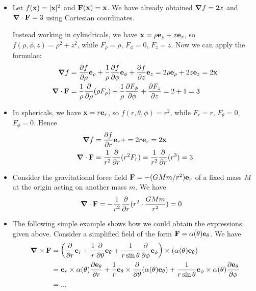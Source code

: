 \documentclass{../template/note}
\begin{document}
    \begin{example*}
        \begin{itemize}
            \item Let \(f(\V x) = |\V x|^2\) and \(\V F(\V x) = \V x\). We have already obtained \(\grad f = 2x\) and \(\div \V F = 3\) using Cartesian coordinates.
            
            Instead working in cylindricals, we have \(\V x = \rho \V e_\rho + z \V e_z\), so \(f(\rho, \phi, z) = \rho^2 + z^2\), while \(F_\rho = \rho\), \(F_\phi = 0\), \(F_z = z\). Now we can apply the formulae:
            \begin{align*}
                \grad f &= \pd f \rho \V e_\rho + \frac 1 \rho \pd f \phi \V e_\phi + \pd f z \V e_z = 2\rho \V e_\rho + 2z \V e_z = 2\V x \\
                \div \V F &= \frac 1 \rho \pd{}\rho(\rho F_\rho) + \frac 1 \rho \pd{F_\phi}{\phi} + \pd{F_z}{z} = 2 + 1 = 3
            \end{align*}
            \item In sphericals, we have \(\V x = r \V e_r\), so \(f(r, \theta, \phi) = r^2\), while \(F_r = r\), \(F_\theta = 0\), \(F_\phi = 0\). Hence
            \begin{align*}
                \grad f &= \pd{f}{r} \V e_r + = 2r \V e_r = 2 \V x \\
                \div \V F &= \frac 1 {r^2} \pd{} r (r^2F_r) = \frac 1 {r^2} \pd{} r (r^3) = 3
            \end{align*}
            \item Consider the gravitational force field \(\V F = -(GMm/r^2)\V e_r\) of a fixed mass \(M\) at the origin acting on another mass \(m\). We have
            \begin{align*}
                \div \V F = -\frac 1 {r^2} \pd{} r (r^2 \cdot \frac{GMm}{r^2}) &= 0 
            \end{align*}
            \item The following simple example shows how we could obtain the expressions given above. Consider a simplified field of the form \(\V F = \alpha(\theta) \V e_\theta\). We have
            \begin{align*}
                \curl \V F &= \left(\pd{}{r} \V e_r + \frac 1 r \pd{}{\theta} \V e_\theta + \frac 1{r \sin \theta} \pd {} \phi \V e_\phi\right) \times (\alpha(\theta)\V e_\theta) \\
                &= \V e_r \times \alpha(\theta) \pd{\V e_\theta}{r} + \frac 1 r \V e_\theta \times \pd{} \theta (\alpha(\theta) \V e_\theta) + \frac 1 {r \sin \theta} \V e_\phi \times \alpha(\theta) \pd{\V e_\theta}{\phi} \\
                &= ...
            \end{align*}
        \end{itemize}
    \end{example*}
    
\end{document}
